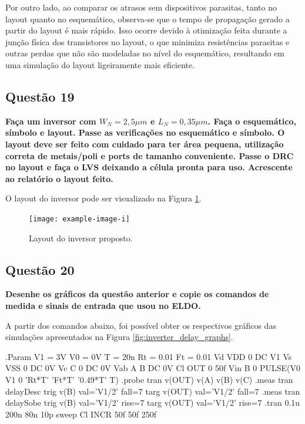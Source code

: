 \documentclass[12pt,a4paper]{article}
\begin{document}
Por outro lado, ao comparar os atrasos sem dispositivos parasitas, tanto no layout quanto no esquemático, observa-se que o tempo de propagação gerado a partir do layout é mais rápido. Isso ocorre devido à otimização feita durante a junção física dos transistores no layout, o que minimiza resistências parasitas e outras perdas que não são modeladas no nível do esquemático, resultando em uma simulação do layout ligeiramente mais eficiente.

\subsection*{Questão 19}

	\textbf{Faça um inversor com $W_N = 2,5 \mu m$ e $L_N = 0,35 \mu m$. Faça o esquemático, símbolo e layout. Passe as verificações no esquemático e símbolo. O layout deve ser feito com cuidado para ter área pequena, utilização correta de metais/poli e ports de tamanho conveniente. Passe o DRC no layout e faça o LVS deixando a célula pronta para uso. Acrescente ao relatório o layout feito.}

O layout do inversor pode ser visualizado na Figura \ref{fig:inverter_layout}.

\begin{figure}[H]
    \centering
    \texttt{[image: example-image-i]}
    \caption{Layout do inversor proposto.}
    \label{fig:inverter_layout}
\end{figure}

\subsection*{Questão 20}

	\textbf{Desenhe os gráficos da questão anterior e copie os comandos de medida e sinais de entrada que usou no ELDO.}

A partir dos comandos abaixo, foi possível obter os respectivos gráficos das simulações apresentados na Figura \ref{fig:inverter_delay_graphs}.

\begin{codeblock}[title={Comandos ELDO para Inversor}, label={lst:inverter_eldo_commands}, listing options={language=TeX}]
.Param V1 = 3V V0 = 0V T = 20n Rt = 0.01 Ft = 0.01
Vd VDD 0 DC V1
Vs VSS 0 DC 0V
Vc C 0 DC 0V
Vab A B DC 0V
Cl OUT 0 50f
Vin B 0 PULSE(V0 V1 0 'Rt*T' 'Ft*T' '0.49*T' T)
.probe tran v(OUT) v(A) v(B) v(C)
.meas tran delayDesc trig v(B) val='V1/2' fall=7 targ v(OUT) val='V1/2'
fall=7
.meas tran delaySobe trig v(B) val='V1/2' rise=7 targ v(OUT) val='V1/2'
rise=7
.tran 0.1u 200n 80n 10p sweep Cl INCR 50f 50f 250f
\end{codeblock}
\end{document}
